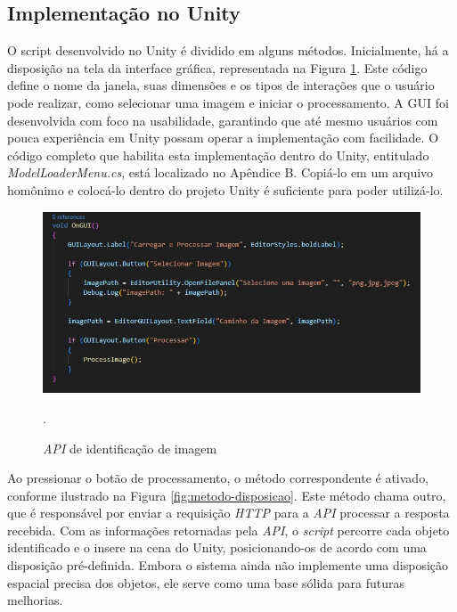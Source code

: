 \subsection{Implementação no Unity}

O script desenvolvido no Unity é dividido em alguns métodos. Inicialmente, há a disposição na tela da interface gráfica, representada na Figura \ref{fig:metodo-gui}. Este código define o nome da janela, suas dimensões e os tipos de interações que o usuário pode realizar, como selecionar uma imagem e iniciar o processamento. A GUI foi desenvolvida com foco na usabilidade, garantindo que até mesmo usuários com pouca experiência em Unity possam operar a implementação com facilidade. O código completo que habilita esta implementação dentro do Unity, entitulado \textit{ModelLoaderMenu.cs}, está localizado no Apêndice B. Copiá-lo em um arquivo homônimo e colocá-lo dentro do projeto Unity é suficiente para poder utilizá-lo.

\begin{figure}[!h]
    \centering
    \begin{minipage}{0.7\linewidth}
    \centering
    \captionsetup{justification=centering,margin=0.5cm,font=small}
    \includegraphics[width=1\linewidth]{img/cap5/gui-codigo.jpeg}
    \caption{\textit{API} de identificação de imagem}.
    \label{fig:metodo-gui}
    \end{minipage}
\end{figure}

Ao pressionar o botão de processamento, o método correspondente é ativado, conforme ilustrado na Figura \ref{fig:metodo-disposicao}. Este método chama outro, que é responsável por enviar a requisição \textit{HTTP} para a \textit{API} processar a resposta recebida. Com as informações retornadas pela \textit{API}, o \textit{script} percorre cada objeto identificado e o insere na cena do Unity, posicionando-os de acordo com uma disposição pré-definida. Embora o sistema ainda não implemente uma disposição espacial precisa dos objetos, ele serve como uma base sólida para futuras melhorias.

